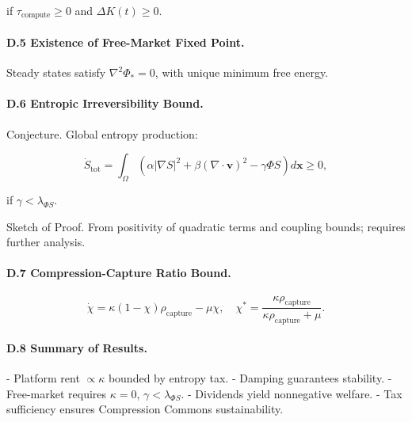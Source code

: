 \documentclass[12pt]{article}
\begin{document}
if \(\tau_{\text{compute}} \geq 0\) and \(\Delta K(t) \geq 0\).

\paragraph{D.5 Existence of Free-Market Fixed Point.}

Steady states satisfy \(\nabla^2 \Phi_* = 0\), with unique minimum free energy.

\paragraph{D.6 Entropic Irreversibility Bound.}

Conjecture. Global entropy production:

\[
\dot{S}_{\text{tot}} = \int_\Omega (\alpha |\nabla S|^2 + \beta (\nabla \cdot \mathbf{v})^2 - \gamma \Phi S) d\mathbf{x} \geq 0,
\]

if \(\gamma < \lambda_{\Phi S}\).

Sketch of Proof. From positivity of quadratic terms and coupling bounds; requires further analysis.

\paragraph{D.7 Compression-Capture Ratio Bound.}

\[
\dot{\chi} = \kappa (1 - \chi) \rho_{\text{capture}} - \mu \chi, \quad \chi^* = \frac{\kappa \rho_{\text{capture}}}{\kappa \rho_{\text{capture}} + \mu}.
\]

\paragraph{D.8 Summary of Results.}

- Platform rent \(\propto \kappa\) bounded by entropy tax.
- Damping guarantees stability.
- Free-market requires \(\kappa = 0\), \(\gamma < \lambda_{\Phi S}\).
- Dividends yield nonnegative welfare.
- Tax sufficiency ensures Compression Commons sustainability.



\end{document}
